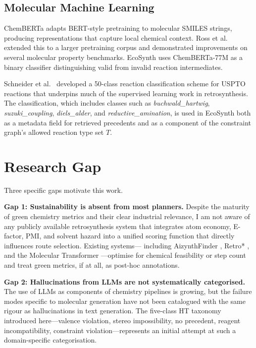 \documentclass[12pt,a4paper]{article}
\begin{document}
\subsection{Molecular Machine Learning}

ChemBERTa \cite{chithrananda2020chemberta} adapts BERT-style pretraining
\cite{devlin2019bert} to molecular SMILES strings, producing representations
that capture local chemical context. Ross et al.~\cite{ross2022chemberta2}
extended this to a larger pretraining corpus and demonstrated improvements on
several molecular property benchmarks. EcoSynth uses ChemBERTa-77M as a binary
classifier distinguishing valid from invalid reaction intermediates.

Schneider et al.~\cite{schneider2016classification} developed a 50-class
reaction classification scheme for USPTO reactions that underpins much of the
supervised learning work in retrosynthesis. The classification, which includes
classes such as \textit{buchwald\_hartwig}, \textit{suzuki\_coupling},
\textit{diels\_alder}, and \textit{reductive\_amination}, is used in EcoSynth
both as a metadata field for retrieved precedents and as a component of the
constraint graph's allowed reaction type set $T$.

\section{Research Gap}

Three specific gaps motivate this work.

\textbf{Gap 1: Sustainability is absent from most planners.}
Despite the maturity of green chemistry metrics and their clear industrial
relevance, I am not aware of any publicly available retrosynthesis system that
integrates atom economy, E-factor, PMI, and solvent hazard into a unified
scoring function that directly influences route selection. Existing systems—
including AizynthFinder \cite{genheden2020aizynthfinder}, Retro* \cite{chen2020retro},
and the Molecular Transformer \cite{schwaller2019molecular}—optimise for
chemical feasibility or step count and treat green metrics, if at all, as
post-hoc annotations.

\textbf{Gap 2: Hallucinations from LLMs are not systematically categorised.}
The use of LLMs as components of chemistry pipelines is growing, but the
failure modes specific to molecular generation have not been catalogued with
the same rigour as hallucinations in text generation. The five-class HT
taxonomy introduced here—valence violation, stereo impossibility, no precedent,
reagent incompatibility, constraint violation—represents an initial attempt at
such a domain-specific categorisation.
\end{document}
